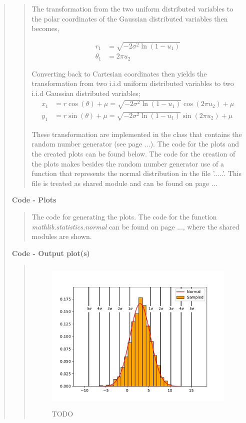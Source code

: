 \begin{quote}
\begin{quote}
The transformation from the two uniform distributed variables to the polar coordinates of the Gaussian distributed variables then becomes,

\begin{align}
r_1 &=  \sqrt{-2\sigma^2 \ln(1 - u_1)} \\
\theta_1 &= 2 \pi u_2
\end{align}

Converting back to Cartesian coordinates then yields the transformation from two i.i.d uniform distributed variables to two i.i.d Gaussian distributed variables;
\begin{align*}
x_1 &= r\cos(\theta) + \mu = \sqrt{-2\sigma^2 \ln(1 - u_1)} \cos( 2 \pi u_2 ) + \mu \\
y_1 &= r\sin(\theta) + \mu = \sqrt{-2\sigma^2 \ln(1 - u_1)} \sin( 2 \pi u_2 ) + \mu
\end{align*}

These transformation are implemented in the class that contains the random number generator (see page ...). The code for the plots and the created plots can be found below. The code for the creation of the plots makes besides the random number generator use of a function that represents the normal distribution in the file '.....'. This file is treated as shared module and can be found on page ...
\end{quote}

\textbf{Code - Plots}

\begin{quote}
The code for generating the plots. The code for the function \textit{mathlib.statistics.normal} can be found on page ..., where the shared modules are shown. 


\end{quote}


\textbf{Code - Output plot(s)}
\begin{quote}
\begin{figure}[!ht]
\centering
\includegraphics[width=12cm, height=7.5cm]{./Plots/1_hist_gaussian.pdf}
\caption{TODO}
\end{figure}

\end{quote}
\end{quote}

